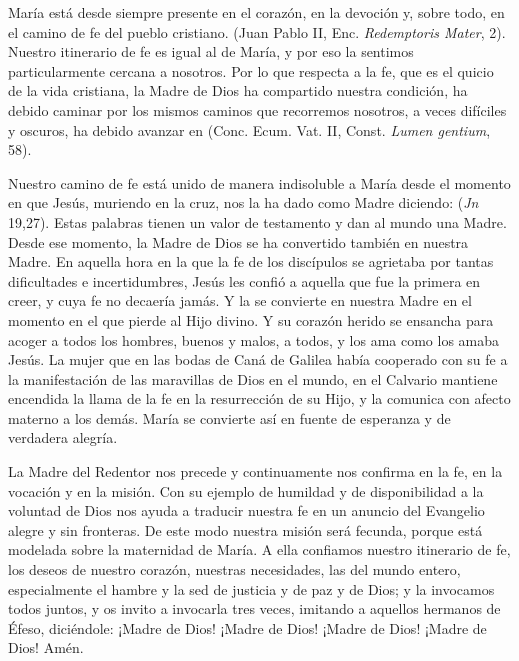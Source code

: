 \begin{body}
	María está desde siempre presente en el corazón, en la devoción y, sobre todo, en el camino de fe del pueblo cristiano.  (Juan Pablo II, Enc. \emph{Redemptoris Mater}, 2). Nuestro itinerario de fe es igual al de María, y por eso la sentimos particularmente cercana a nosotros. Por lo que respecta a la fe, que es el quicio de la vida cristiana, la Madre de Dios ha compartido nuestra condición, ha debido caminar por los mismos caminos que recorremos nosotros, a veces difíciles y oscuros, ha debido avanzar en  (Conc. Ecum. Vat. II, Const. \emph{Lumen gentium}, 58).
	
	Nuestro camino de fe está unido de manera indisoluble a María desde el momento en que Jesús, muriendo en la cruz, nos la ha dado como Madre diciendo:  (\emph{Jn} 19,27). Estas palabras tienen un valor de testamento y dan al mundo una Madre. Desde ese momento, la Madre de Dios se ha convertido también en nuestra Madre. En aquella hora en la que la fe de los discípulos se agrietaba por tantas dificultades e incertidumbres, Jesús les confió a aquella que fue la primera en creer, y cuya fe no decaería jamás. Y la  se convierte en nuestra Madre en el momento en el que pierde al Hijo divino. Y su corazón herido se ensancha para acoger a todos los hombres, buenos y malos, a todos, y los ama como los amaba Jesús. La mujer que en las bodas de Caná de Galilea había cooperado con su fe a la manifestación de las maravillas de Dios en el mundo, en el Calvario mantiene encendida la llama de la fe en la resurrección de su Hijo, y la comunica con afecto materno a los demás. María se convierte así en fuente de esperanza y de verdadera alegría.
	
	La Madre del Redentor nos precede y continuamente nos confirma en la fe, en la vocación y en la misión. Con su ejemplo de humildad y de disponibilidad a la voluntad de Dios nos ayuda a traducir nuestra fe en un anuncio del Evangelio alegre y sin fronteras. De este modo nuestra misión será fecunda, porque está modelada sobre la maternidad de María. A ella confiamos nuestro itinerario de fe, los deseos de nuestro corazón, nuestras necesidades, las del mundo entero, especialmente el hambre y la sed de justicia y de paz y de Dios; y la invocamos todos juntos, y os invito a invocarla tres veces, imitando a aquellos hermanos de Éfeso, diciéndole: ¡Madre de Dios! ¡Madre de Dios! ¡Madre de Dios! ¡Madre de Dios! Amén.
\end{body}

